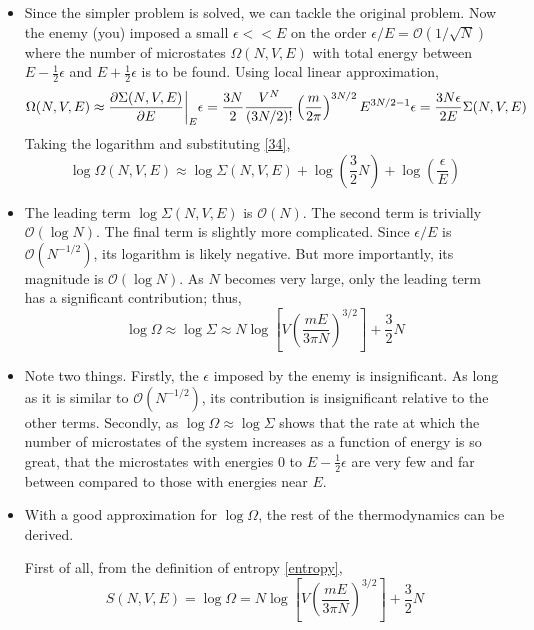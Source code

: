 \documentclass{article}
\begin{document}
\begin{itemize}
\begin{equation}
    \end{equation}
    \item Since the simpler problem is solved, we can tackle the original problem. Now the enemy (you) imposed a small $\epsilon<<E$ on the order $\epsilon/E=\mathcal{O}(1/\sqrt{N})$ where the number of microstates $\Omega(N,V,E)$ with total energy between $E-\frac{1}{2}\epsilon$ and $E+\frac{1}{2}\epsilon$ is to be found. Using local linear approximation,
    \begin{equation}
        \Omega(N,V,E)\approx\partialderivative{\Sigma(N,V,E)}{E}\bigg|_{E}\epsilon=\frac{3N}{2}\frac{V^N}{(3N/2)!}\left(\frac{m}{2\pi}\right)^{3N/2}E^{3N/2-1}\epsilon=\frac{3N\epsilon}{2E}\Sigma(N,V,E)
    \end{equation}
    Taking the logarithm and substituting \eqref{34},\begin{equation}
        \log\Omega(N,V,E)\approx \log\Sigma(N,V,E)+\log\left(\frac{3}{2}N\right)+\log(\frac{\epsilon}{E})
    \end{equation}
    \item The leading term $\log\Sigma(N,V,E)$ is $\mathcal{O}(N)$. The second term is trivially $\mathcal{O}(\log N)$. The final term is slightly more complicated. Since $\epsilon/E$ is $\mathcal{O}(N^{-1/2})$, its logarithm is likely negative. But more importantly, its magnitude is $\mathcal{O}(\log N)$. As $N$ becomes very large, only the leading term has a significant contribution; thus, \begin{equation}
        \log\Omega\approx\log\Sigma\approx N\log\left[V\left(\frac{mE}{3\pi N}\right)^{3/2}\right]+\frac{3}{2}N
    \end{equation}
    \item Note two things. Firstly, the $\epsilon$ imposed by the enemy is insignificant. As long as it is similar to $\mathcal{O}(N^{-1/2})$, its contribution is insignificant relative to the other terms. Secondly, as $\log\Omega\approx\log\Sigma$ shows that the rate at which the number of microstates of the system increases as a function of energy is so great, that the microstates with energies $0$ to $E-\frac{1}{2}\epsilon$ are very few and far between compared to those with energies near $E$.
    \item With a good approximation for $\log\Omega$, the rest of the thermodynamics can be derived.
    \begin{derivation}
        First of all, from the definition of entropy \eqref{entropy},
        \begin{equation}
            S(N,V,E)=\log\Omega=N\log\left[V\left(\frac{mE}{3\pi N}\right)^{3/2}\right]+\frac{3}{2}N

\end{equation}
\end{derivation}
\end{itemize}
\end{document}
